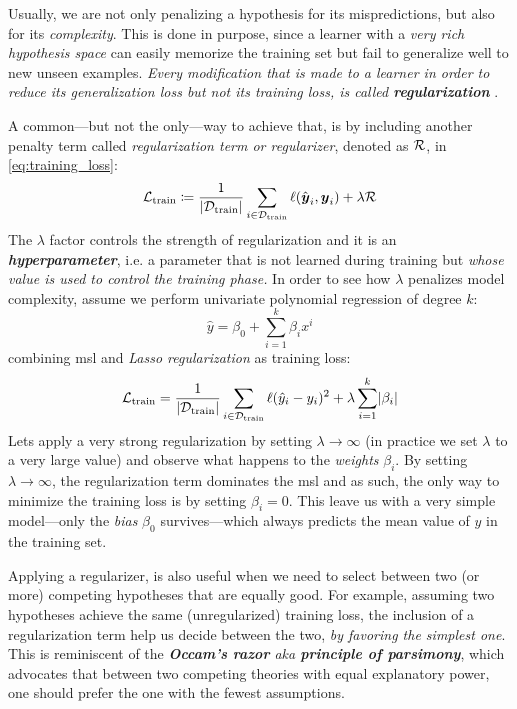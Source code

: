 Usually, we are not only penalizing a hypothesis for its mispredictions, but
also for its \emph{complexity}. This is done in purpose, since a learner with a
\emph{very rich hypothesis space} can easily memorize the training set but fail
to generalize well to new unseen examples. \emph{Every modification that is made
to a learner in order to reduce its generalization loss but not its training
loss, is called \textbf{regularization}} \parencite{deeplearning}.

A common---but not the only---way to achieve that, is by including another
penalty term called \emph{regularization term or
regularizer}, denoted as $\mathcal{R}$, in \Equation{}
\ref{eq:training_loss}:
\begin{equation}
	\label{eq:regularization}
	\mathcal{L}_\text{train} \coloneqq \frac{1}{\lvert \mathcal{D}_\text{train} \rvert} \sum_{i \in \mathcal{D}_\text{train}}
	\ell(\hat{\boldsymbol{y}}_i, \boldsymbol{y}_i)
	+
	\lambda \mathcal{R}
\end{equation}
The $\lambda$ factor controls the strength of regularization and it is an
\emph{\textbf{hyperparameter}}, i.e. a parameter that is
not learned during training but \emph{whose value is used to control the
training phase.} In order to see how $\lambda$ penalizes
model complexity, assume we perform univariate polynomial
regression of degree $k$:
\begin{equation}
	\hat{y} = \beta_0 + \sum_{i=1}^k \beta_i x^i
\end{equation}
combining \gls{msl} and \emph{Lasso
regularization} as training loss:
\begin{equation}
	\label{eq:lasso}
	\mathcal{L}_\text{train} = \frac{1}{\lvert \mathcal{D}_\text{train} \rvert} \sum_{i \in \mathcal{D}_\text{train}}
	\ell(\hat{y}_i - y_i)^2
	+
	\lambda \sum_{i=1}^k \lvert \beta_i \rvert
\end{equation}
Lets apply a very strong regularization by setting $\lambda \to \infty$ (in
practice we set $\lambda$ to a very large value) and observe what happens to the
\emph{weights} $\beta_i$. By setting $\lambda \to
\infty$, the regularization term dominates the \gls{msl} and as such, the only
way to minimize the training loss is by setting $\beta_i = 0$. This leave us
with a very simple model---only the \emph{bias} $\beta_0$
survives---which always predicts the mean value of $y$ in the training set.

Applying a regularizer, is also useful when we need to select
between two (or more) competing hypotheses that are equally good. For example,
assuming two hypotheses achieve the same (unregularized) training loss, the
inclusion of a regularization term help us decide between the two, \emph{by
favoring the simplest one}. This is reminiscent of the \emph{\textbf{Occam's
razor} aka \textbf{principle of parsimony}}, which advocates that between two competing theories with equal
explanatory power, one should prefer the one with the fewest assumptions.


